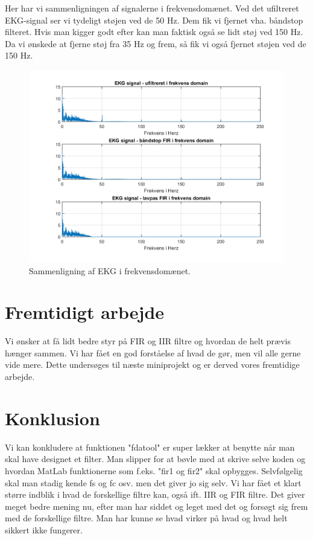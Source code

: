 \documentclass[12pt, letterpaper]{article}
\begin{document}
Her har vi sammenligningen af signalerne i frekvensdomænet. Ved det ufiltreret EKG-signal ser vi tydeligt støjen ved de 50 Hz. Dem fik vi fjernet vha. båndstop filteret. 
Hvis man kigger godt efter kan man faktisk også se lidt støj ved 150 Hz. Da vi ønskede at fjerne støj fra 35 Hz og frem, så fik vi også fjernet støjen ved de 150 Hz. 


\begin{figure}[H]
           \includegraphics[width=\linewidth]{billeder/EKGfrekvensdomain}	   							\caption{Sammenligning af EKG i frekvensdomænet.}
\end{figure}


\section{Fremtidigt arbejde}
Vi ønsker at få lidt bedre styr på FIR og IIR filtre og hvordan de helt prævis hænger sammen. Vi har fået en god forståelse af hvad de gør, men vil alle gerne vide mere. Dette undersøges til næste miniprojekt og er derved vores fremtidige arbejde.

\section{Konklusion}
Vi kan konkludere at funktionen "fdatool" er super lækker at benytte når man skal have designet et filter. Man slipper for at bøvle med at skrive selve koden og hvordan MatLab funktionerne som f.eks. "fir1 og fir2" skal opbygges. Selvfølgelig skal man stadig kende fs og fc osv. men det giver jo sig selv. 
Vi har fået et klart større indblik i hvad de forskellige filtre kan, også ift. IIR og FIR filtre. Det giver meget bedre mening nu, efter man har siddet og leget med det og forsøgt sig frem med de forskellige filtre. Man har kunne se hvad virker på hvad og hvad helt sikkert ikke fungerer. 
\end{document}
